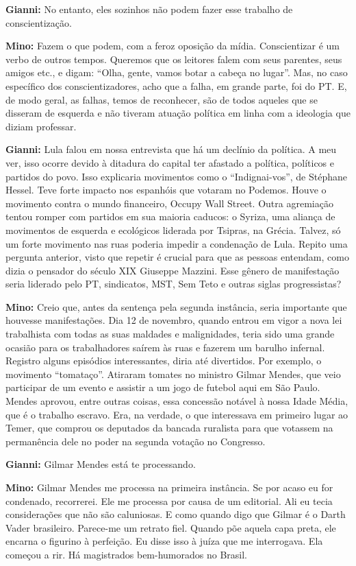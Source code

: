 \textbf{Gianni:} No entanto, eles sozinhos não podem fazer esse trabalho
de conscientização.

\textbf{Mino:} Fazem o que podem, com a feroz oposição da mídia.
Conscientizar é um verbo de outros tempos. Queremos que os leitores
falem com seus parentes, seus amigos etc., e digam: ``Olha, gente, vamos
botar a cabeça no lugar''. Mas, no caso específico dos
conscientizadores, acho que a falha, em grande parte, foi do PT. E, de
modo geral, as falhas, temos de reconhecer, são de todos aqueles que se
disseram de esquerda e não tiveram atuação política em linha com a
ideologia que diziam professar.

\textbf{Gianni:} Lula falou em nossa entrevista que há um declínio da
política. A meu ver, isso ocorre devido à ditadura do capital ter
afastado a política, políticos e partidos do povo. Isso explicaria
movimentos como o ``Indignai-vos'', de Stéphane Hessel. Teve forte
impacto nos espanhóis que votaram no Podemos. Houve o movimento contra o
mundo financeiro, Occupy Wall Street. Outra agremiação tentou romper com
partidos em sua maioria caducos: o Syriza, uma aliança de movimentos de
esquerda e ecológicos liderada por Tsipras, na Grécia. Talvez, só um
forte movimento nas ruas poderia impedir a condenação de Lula. Repito
uma pergunta anterior, visto que repetir é crucial para que as pessoas
entendam, como dizia o pensador do século XIX Giuseppe Mazzini. Esse
gênero de manifestação seria liderado pelo PT, sindicatos, MST, Sem Teto
e outras siglas progressistas?

\textbf{Mino:} Creio que, antes da sentença pela segunda instância,
seria importante que houvesse manifestações. Dia 12 de novembro, quando
entrou em vigor a nova lei trabalhista com todas as suas maldades e
malignidades, teria sido uma grande ocasião para os trabalhadores saírem
às ruas e fazerem um barulho infernal. Registro alguns episódios
interessantes, diria até divertidos. Por exemplo, o movimento
``tomataço''. Atiraram tomates no ministro Gilmar Mendes, que veio
participar de um evento e assistir a um jogo de futebol aqui em São
Paulo. Mendes aprovou, entre outras coisas, essa concessão notável à
nossa Idade Média, que é o trabalho escravo. Era, na verdade, o que
interessava em primeiro lugar ao Temer, que comprou os deputados da
bancada ruralista para que votassem na permanência dele no poder na
segunda votação no Congresso.

\textbf{Gianni:} Gilmar Mendes está te processando.

\textbf{Mino:} Gilmar Mendes me processa na primeira instância. Se por
acaso eu for condenado, recorrerei. Ele me processa por causa de um
editorial. Ali eu tecia considerações que não são caluniosas. E como
quando digo que Gilmar é o Darth Vader brasileiro. Parece-me um retrato
fiel. Quando põe aquela capa preta, ele encarna o figurino à perfeição.
Eu disse isso à juíza que me interrogava. Ela começou a rir. Há
magistrados bem-humorados no Brasil.

